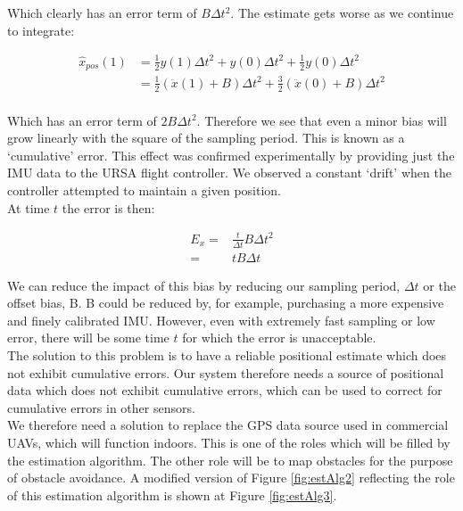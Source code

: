 \documentclass[capstone_report.tex]{subfiles}
\begin{document}
Which clearly has an error term of $B\Delta t^2$. The estimate gets worse as we continue to integrate:

\begin{align*}
\hat{x}_{pos}(1)&=\frac{1}{2}y(1)\Delta t^2+y(0)\Delta t^2+\frac{1}{2}y(0)\Delta t^2\\
&=\frac{1}{2}(\ddot{x}(1)+B)\Delta t^2+\frac{3}{2}(\ddot{x}(0)+B)\Delta t^2\\   	
\end{align*}

Which has an error term of $2B\Delta t^2$. Therefore we see that even a minor bias will grow linearly with the square of the sampling period. This is known as a `cumulative' error. This effect was confirmed experimentally by providing just the IMU data to the URSA flight controller. We observed a constant `drift' when the controller attempted to maintain a given position.\\

At time $t$ the error is then:

\begin{align*} 
	E_x=&\frac{t}{\Delta t}B\Delta t^2\\
	=&tB\Delta t
\end{align*}

We can reduce the impact of this bias by reducing our sampling period, $\Delta t$ or the offset bias, B. B could be reduced by, for example, purchasing a more expensive and finely calibrated IMU. However, even with extremely fast sampling or low error, there will be some time $t$ for which the error is unacceptable.\\

The solution to this problem is to have a reliable positional estimate which does not exhibit cumulative errors. Our system therefore needs a source of positional data which does not exhibit cumulative errors, which can be used to correct for cumulative errors in other sensors. \\

We therefore need a solution to replace the GPS data source used in commercial UAVs, which will function indoors. This is one of the roles which will be filled by the estimation algorithm. The other role will be to map obstacles for the purpose of obstacle avoidance. A modified version of Figure \ref{fig:estAlg2} reflecting the role of this estimation algorithm is shown at Figure \ref{fig:estAlg3}.\\
\end{document}
